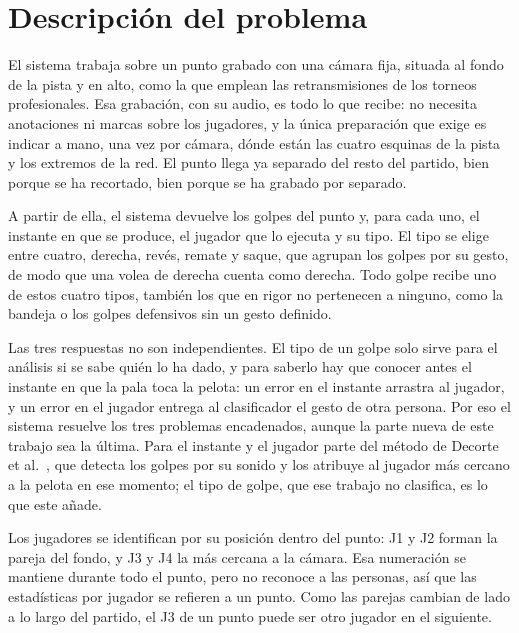 
\section{Descripción del problema}
\label{sec:problema}

El sistema trabaja sobre un punto grabado con una cámara fija, situada al fondo de la pista y en alto, como la que emplean las retransmisiones de los torneos profesionales.
Esa grabación, con su audio, es todo lo que recibe: no necesita anotaciones ni marcas sobre los jugadores, y la única preparación que exige es indicar a mano, una vez por cámara, dónde están las cuatro esquinas de la pista y los extremos de la red.
El punto llega ya separado del resto del partido, bien porque se ha recortado, bien porque se ha grabado por separado.

A partir de ella, el sistema devuelve los golpes del punto y, para cada uno, el instante en que se produce, el jugador que lo ejecuta y su tipo.
El tipo se elige entre cuatro, derecha, revés, remate y saque, que agrupan los golpes por su gesto, de modo que una volea de derecha cuenta como derecha.
Todo golpe recibe uno de estos cuatro tipos, también los que en rigor no pertenecen a ninguno, como la bandeja o los golpes defensivos sin un gesto definido.

Las tres respuestas no son independientes.
El tipo de un golpe solo sirve para el análisis si se sabe quién lo ha dado, y para saberlo hay que conocer antes el instante en que la pala toca la pelota: un error en el instante arrastra al jugador, y un error en el jugador entrega al clasificador el gesto de otra persona.
Por eso el sistema resuelve los tres problemas encadenados, aunque la parte nueva de este trabajo sea la última.
Para el instante y el jugador parte del método de Decorte et al.~\cite{decorte2024padel}, que detecta los golpes por su sonido y los atribuye al jugador más cercano a la pelota en ese momento; el tipo de golpe, que ese trabajo no clasifica, es lo que este añade.

Los jugadores se identifican por su posición dentro del punto: J1 y J2 forman la pareja del fondo, y J3 y J4 la más cercana a la cámara.
Esa numeración se mantiene durante todo el punto, pero no reconoce a las personas, así que las estadísticas por jugador se refieren a un punto.
Como las parejas cambian de lado a lo largo del partido, el J3 de un punto puede ser otro jugador en el siguiente.


